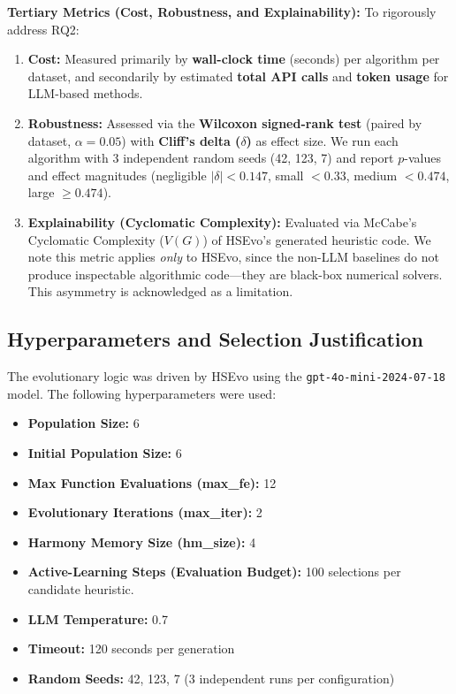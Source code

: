 \documentclass[sigconf,nonacm]{acmart}
\begin{document}
\textbf{Tertiary Metrics (Cost, Robustness, and Explainability):} To rigorously address RQ2:
\begin{enumerate}
\item \textbf{Cost:} Measured primarily by \textbf{wall-clock time} (seconds) per algorithm per dataset, and secondarily by estimated \textbf{total API calls} and \textbf{token usage} for LLM-based methods.
\item \textbf{Robustness:} Assessed via the \textbf{Wilcoxon signed-rank test} (paired by dataset, $\alpha = 0.05$) with \textbf{Cliff's delta ($\delta$)} as effect size. We run each algorithm with 3 independent random seeds (42, 123, 7) and report $p$-values and effect magnitudes (negligible $|\delta|<0.147$, small $<0.33$, medium $<0.474$, large $\geq 0.474$).
\item \textbf{Explainability (Cyclomatic Complexity):} Evaluated via McCabe's Cyclomatic Complexity ($V(G)$) of HSEvo's generated heuristic code. We note this metric applies \emph{only} to HSEvo, since the non-LLM baselines do not produce inspectable algorithmic code---they are black-box numerical solvers. This asymmetry is acknowledged as a limitation.
\end{enumerate}

\subsection{Hyperparameters and Selection Justification}

The evolutionary logic was driven by HSEvo \cite{dat2025hsevo} using the \texttt{gpt-4o-mini-2024-07-18} model. The following hyperparameters were used:
\begin{itemize}
\item \textbf{Population Size:} 6
\item \textbf{Initial Population Size:} 6
\item \textbf{Max Function Evaluations (max\_fe):} 12
\item \textbf{Evolutionary Iterations (max\_iter):} 2
\item \textbf{Harmony Memory Size (hm\_size):} 4
\item \textbf{Active-Learning Steps (Evaluation Budget):} 100 selections per candidate heuristic.
\item \textbf{LLM Temperature:} 0.7
\item \textbf{Timeout:} 120 seconds per generation
\item \textbf{Random Seeds:} 42, 123, 7 (3 independent runs per configuration)
\end{itemize}
\end{document}
